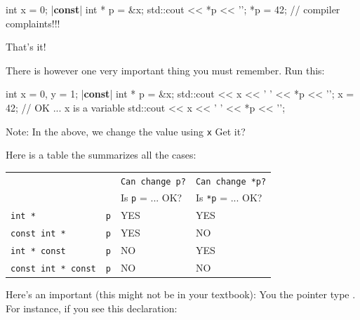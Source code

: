 \begin{consolethree}[escapeinside=||]
int x = 0;
|\textbf{const}| int * p = &x;
std::cout << *p << '\n';
*p = 42; // compiler complaints!!!
\end{consolethree}
That's it!

There is however one very important thing you must remember. Run this:

\begin{consolethree}[escapeinside=||]
int x = 0, y = 1;
|\textbf{const}| int * p = &x;
std::cout << x << ' ' << *p << '\n';
x = 42;                  // OK ... x is a variable
std::cout << x << ' ' << *p << '\n';
\end{consolethree}

Note:  In the above, we change the value using \texttt{x} Get it?

Here is a table the summarizes all the cases:







\begin{tabular}{l l l l}
    & & \texttt{Can change p?} & \texttt{Can change *p?} \\
    & & Is \texttt{p} = ... OK? & Is \texttt{*p} = ... OK? \\
    \texttt{int *} & \texttt{p} & YES & YES \\
    \texttt{const int *} & \texttt{p} & YES & NO \\
    \texttt{int * const} & \texttt{p} & NO & YES \\
    \texttt{const int * const} & \texttt{p} & NO & NO \\
\end{tabular}

Here's an important  (this might not be in your textbook): You  the pointer type . For instance, if you see this declaration:

